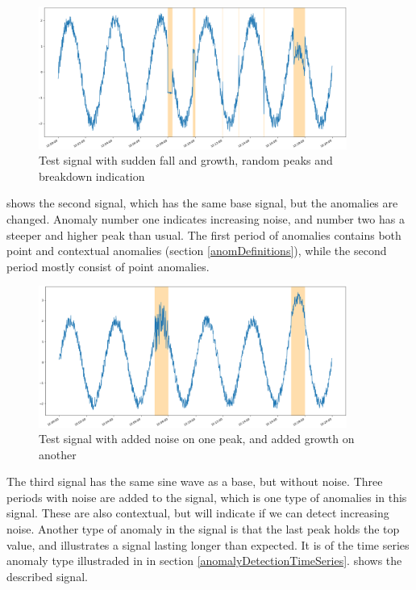 \documentclass[english, a4paper]{report}
\begin{document}
{{{            \begin{figure}[H]
                \centering
                \includegraphics[width=0.9\textwidth]{AnomType1}
                \caption{Test signal with sudden fall and growth, random peaks and breakdown indication}
                \label{fig:AnomType1}
            \end{figure}
    
             shows the second signal, which has the same base signal, but the anomalies are changed. Anomaly number one indicates increasing noise, and number two has a steeper and higher peak than usual. The first period of anomalies contains both point and contextual anomalies (section \ref{anomDefinitions}), while the second period mostly consist of point anomalies.
            
            \begin{figure}[H]
                \centering
                \includegraphics[width=0.9\textwidth]{AnomType2}
                \caption{Test signal with added noise on one peak, and added growth on another}
                \label{fig:AnomType2}
            \end{figure}
            
            The third signal has the same sine wave as a base, but without noise. Three periods with noise are added to the signal, which is one type of anomalies in this signal. These are also contextual, but will indicate if we can detect increasing noise. Another type of anomaly in the signal is that the last peak holds the top value, and illustrates a signal lasting longer than expected. It is of the time series anomaly type illustraded in  in section \ref{anomalyDetectionTimeSeries}.  shows the described signal.
            
}}}
\end{document}

